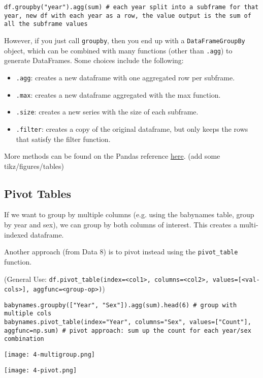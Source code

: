 \begin{verbatim}
df.groupby("year").agg(sum) # each year split into a subframe for that year, new df with each year as a row, the value output is the sum of all the subframe values
\end{verbatim}

However, if you just call \texttt{groupby}, then you end up with a \texttt{DataFrameGroupBy} object, which can be combined with many functions (other than \texttt{.agg}) to generate DataFrames. Some choices include the following:
\begin{itemize}
\item \texttt{.agg}: creates a new dataframe with one aggregated row per subframe.
\item \texttt{.max}: creates a new dataframe aggregated with the max function.
\item \texttt{.size}: creates a new series with the size of each subframe.
\item \texttt{.filter}: creates a copy of the original dataframe, but only keeps the rows that satisfy the filter function.
\end{itemize}
More methods can be found on the Pandas reference \href{https://pandas.pydata.org/docs/reference/groupby.html}{\color{blue}here}.
(add some tikz/figures/tables)

\subsection{Pivot Tables}
If we want to group by multiple columns (e.g. using the babynames table, group by year and sex), we can group by both columns of interest. This creates a multi-indexed dataframe.

Another approach (from Data 8) is to pivot instead using the \texttt{pivot_table} function.

(General Use: \texttt{df.pivot_table(index=<col1>, columns=<col2>, values=[<val-cols>], aggfunc=<group-op>)})

\begin{verbatim}
babynames.groupby(["Year", "Sex"]).agg(sum).head(6) # group with multiple cols
babynames.pivot_table(index="Year", columns="Sex", values=["Count"], aggfunc=np.sum) # pivot approach: sum up the count for each year/sex combination
\end{verbatim}

\begin{minipage}{0.5\textwidth}
\begin{center}
\texttt{[image: 4-multigroup.png]}
\end{center}
\end{minipage}
\begin{minipage}{0.5\textwidth}
\begin{center}
\texttt{[image: 4-pivot.png]}
\end{center}
\end{minipage}

